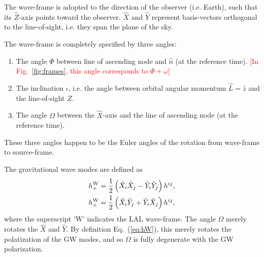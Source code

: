 \documentclass[aps,prd,amssymb,amsmath,amsfonts,superscriptaddress,
floatfix ,preprintnumbers,altaffilletter]{revtex4}
\newcommand{\red}{\textcolor{red}}
\newcommand{\nNR}{\hat{n}}
\newcommand{\lNR}{\hat L}
\newcommand{\EzS}{{{\hat z}}}
\newcommand{\ExW}{\hat X}
\newcommand{\EyW}{\hat Y}
\newcommand{\EzW}{\hat Z}
\newcommand{\hpW}{h_+^{\rm W}}
\newcommand{\hcW}{h_\times^{\rm W}}
\newcommand{\phiRef}{\Phi} %
\begin{document}
The wave-frame is adopted to the direction of the observer
(i.e. Earth), such that its $\EzW$-axis points toward the observer.
$\ExW$ and $\EyW$ represent basis-vectors orthogonal to the
line-of-sight, i.e. they span the plane of the sky.

The wave-frame is completely specified by three angles:
\begin{enumerate}
  \item The angle $\phiRef$ between line of ascending node and $\nNR$
    (at the reference time). \red{[In Fig.~\ref{fig:frames}, this
      angle corresponds to $\phiRef+\omega$]}
  \item The inclination $\iota$, i.e. the angle between orbital
    angular momentum $\lNR=\EzS$ and the line-of-sight $\EzW$.
  \item The angle $\Omega$ between the $\ExW$-axis and the line of
    ascending node (at the reference time).
\end{enumerate}
These three angles happen to be the Euler angles of the rotation from
wave-frame to source-frame.

The gravitational wave modes are defined as
\begin{subequations}
  \label{eq:hW}
  \begin{align}
       \hpW &= \frac{1}{2}\left(\ExW_i\ExW_j-\EyW_i\EyW_j\right)h^{ij},\\
       \hcW &= \frac{1}{2}\left(\ExW_i\EyW_j+\EyW_i\ExW_j\right)h^{ij},
  \end{align}
\end{subequations}
where the superscript 'W' indicates the LAL wave-frame.  The angle
$\Omega$ merely rotates the $\ExW$ and $\EyW$.  By definition
Eq.~(\ref{eq:hW}), this merely rotates the polatization of the GW
modes, and so $\Omega$ is fully degenerate with the GW polarization.  



\end{document}
